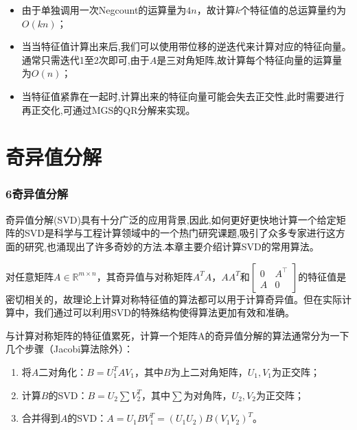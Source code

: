 \documentclass[notheorems,serif]{beamer}
\begin{document}
\begin{frame}
\begin{itemize}
	\item 由于单独调用一次Negcount的运算量为$4n$，故计算$k$个特征值的总运算量约为$O(k n)$；
	\item 当当特征值计算出来后,我们可以使用带位移的逆迭代来计算对应的特征向量。通常只需迭代1至2次即可,由于$A$是三对角矩阵,故计算每个特征向量的运算量为$O(n)$；
	\item 当特征值紧靠在一起时,计算出来的特征向量可能会失去正交性,此时需要进行再正交化,可通过MGS的QR分解来实现。
\end{itemize}
\end{frame}
\section{奇异值分解}
\begin{frame}
\frametitle{6\qquad 奇异值分解}


奇异值分解(SVD)具有十分广泛的应用背景,因此,如何更好更快地计算一个给定矩阵的SVD是科学与工程计算领域中的一个热门研究课题,吸引了众多专家进行这方面的研究,也涌现出了许多奇妙的方法.本章主要介绍计算SVD的常用算法。
\end{frame}
\begin{frame}

对任意矩阵$A \in \mathbb{R}^{m \times n}$，其奇异值与对称矩阵$A^TA$，$AA^T$和$\left[\begin{array}{ll}{0} & {A^{\top}} \\ {A} & {0}\end{array}\right]$的特征值是密切相关的，故理论上计算对称特征值的算法都可以用于计算奇异值。但在实际计算中，我们通过可以利用SVD的特殊结构使得算法更加有效和准确。

与计算对称矩阵的特征值累死，计算一个矩阵A的奇异值分解的算法通常分为一下几个步骤（Jacobi算法除外）：
\begin{enumerate}[1.]
	\item 将$A$二对角化：$B=U_1^TAV_1$，其中$B$为上二对角矩阵，$U_1,V_1$为正交阵；
	\item 计算$B$的SVD：$B=U_2\sum V_2^T$，其中$\sum$为对角阵，$U_2,V_2$为正交阵；
	\item 合并得到$A$的SVD：$A=U_1BV_1^T=(U_1U_2)B(V_1V_2)^T$。
\end{enumerate}
\end{frame}
\end{document}
